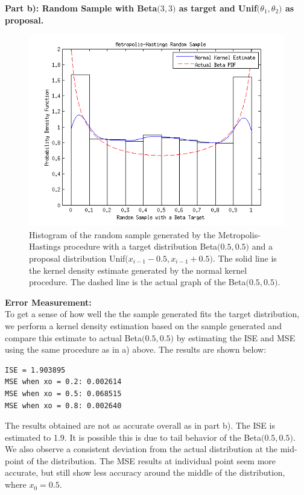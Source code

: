\documentclass[12pt,a4paper]{article}
\begin{document}
\textbf{Part b): Random Sample with Beta$\bigr(3,3)$ as target and Unif$\bigr(\theta_1,\theta_2\bigr)$ as proposal.}
\begin{figure}[ht!] 
\begin{center}
\includegraphics[scale=1]{inclass_graph2.png}
\caption{Histogram of the random sample generated by the Metropolis-Hastings procedure with a target distribution Beta$\bigr(0.5,0.5\bigr)$ and a proposal distribution Unif$\bigr(x_{i-1}-0.5, x_{i-1}+0.5\bigr)$. The solid line is the kernel density estimate generated by the normal kernel procedure. The dashed line is the actual graph of the Beta$\bigr(0.5,0.5\bigr)$.}
\label{inclass fig2}
\end{center}
\end{figure}
\FloatBarrier
\textbf{Error Measurement:}\\
To get a sense of how well the the sample generated fits the target distribution, we perform a kernel density estimation based on the sample generated and compare this estimate to actual Beta$\bigr(0.5,0.5\bigr)$ by estimating the ISE and MSE using the same procedure as in a) above. The results are shown below:
\begin{verbatim}
ISE = 1.903895
MSE when xo = 0.2: 0.002614
MSE when xo = 0.5: 0.068515
MSE when xo = 0.8: 0.002640
\end{verbatim}
The results obtained are not as accurate overall as in part b). The ISE is estimated to 1.9. It is possible this is due to tail behavior of the Beta$\bigr(0.5,0.5\bigr)$. We also observe a consistent deviation from the actual distribution at the mid-point of the distribution. The MSE results at individual point seem more accurate, but still show less accuracy around the middle of the distribution, where $x_0=0.5$.\\
\end{document}
